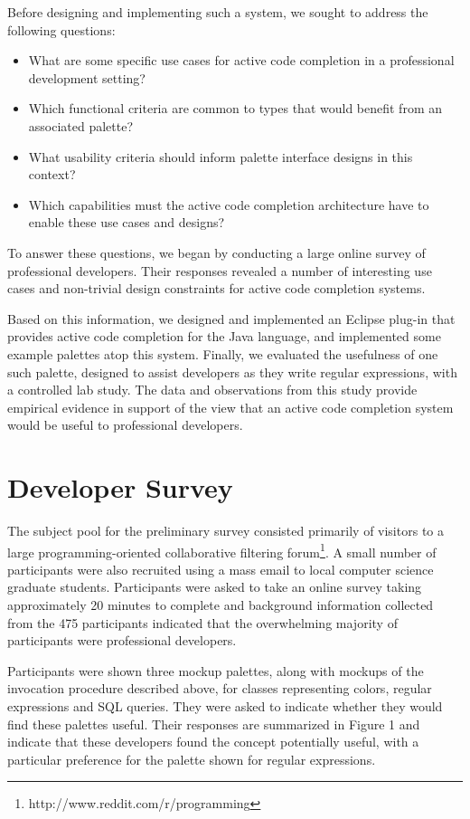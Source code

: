 \documentclass[conference]{IEEEtran}
\begin{document}
Before designing and implementing such a system, we sought to address the following questions:

\begin{itemize}
\item What are some specific use cases for active code completion in a professional development setting? 
\item Which functional criteria are common to types that would benefit from an associated palette?
\item What usability criteria should inform palette interface designs in this context?
\item Which capabilities must the active code completion architecture have to enable these use cases and designs?
\end{itemize}

To answer these questions, we began by conducting a large online survey of professional developers. Their responses revealed a number of interesting use cases and non-trivial design constraints for active code completion systems. 

Based on this information, we designed and implemented an Eclipse plug-in that provides active code completion for the Java language, and implemented some example palettes atop this system. 
Finally, we evaluated the usefulness of one such palette, designed to assist developers as they write regular expressions, with a controlled lab study. The data and observations from this study provide empirical evidence in support of the view that an active code completion system would be useful to professional developers.

\section{Developer Survey}
The subject pool for the preliminary survey consisted primarily of visitors to a large programming-oriented 
collaborative filtering forum\footnote{http://www.reddit.com/r/programming}.
A small number of participants were also recruited using a
mass email to local computer science graduate students. Participants were asked to take an online survey taking  approximately 20 minutes to complete and background information collected from the 475 participants indicated that the overwhelming majority of participants were professional developers.

Participants were shown three mockup palettes, along with mockups of the invocation procedure described above, for classes representing colors, regular expressions and SQL queries. They were asked to indicate whether they would find these palettes useful. Their responses are summarized in Figure 1 and indicate that these developers found the concept potentially useful, with a particular preference for the palette shown for regular expressions.
\end{document}
